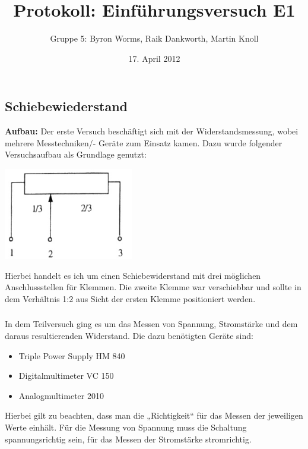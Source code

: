 \documentclass[a4paper,11pt]{article}
\title{Protokoll: Einf\"uhrungsversuch E1}
\author{Gruppe 5: Byron Worms, Raik Dankworth, Martin Knoll}
\date{17. April 2012}
\begin{document}
\begin{titlepage}
\maketitle
\end{titlepage}

\setcounter{section}{5}

\subsection{Schiebewiederstand}

\textbf{Aufbau:}
Der erste Versuch beschäftigt sich mit der Widerstandsmessung, wobei mehrere Messtechniken/- Geräte zum Einsatz kamen. 
Dazu wurde folgender Versuchsaufbau als Grundlage genutzt:

\begin{center}
  \includegraphics[height=40mm]{51}
\end{center}

Hierbei handelt es ich um einen Schiebewiderstand mit drei möglichen Anschlussstellen für Klemmen. Die zweite Klemme war verschiebbar und sollte in dem Verhältnis 1:2 aus Sicht der ersten Klemme positioniert werden. 

\subsubsection{}

In dem Teilversuch ging es um das Messen von Spannung, Stromstärke und dem daraus resultierenden Widerstand. 
Die dazu benötigten Geräte sind:
\begin{itemize}
  \item Triple Power Supply HM 840
  \item Digitalmultimeter VC 150
  \item Analogmultimeter 2010
\end{itemize}
Hierbei gilt zu beachten, dass man die „Richtigkeit“ für das Messen der jeweiligen Werte einhält. Für die Messung von Spannung muss die Schaltung spannungsrichtig sein, für das Messen der Stromstärke stromrichtig. 
\end{document}

